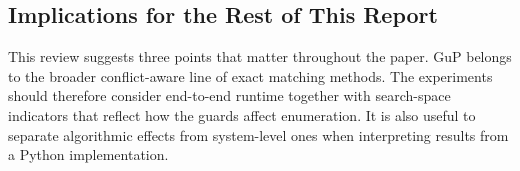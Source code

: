 \subsection{Implications for the Rest of This Report}

This review suggests three points that matter throughout the paper. GuP belongs to the broader conflict-aware line of exact matching methods. The experiments should therefore consider end-to-end runtime together with search-space indicators that reflect how the guards affect enumeration. It is also useful to separate algorithmic effects from system-level ones when interpreting results from a Python implementation.
